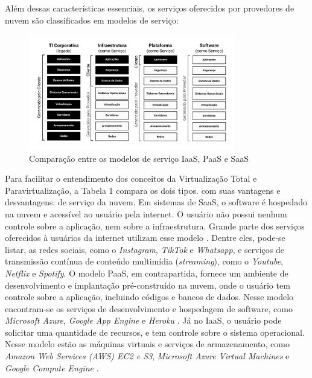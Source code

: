  



Além dessas características essenciais, os serviços oferecidos por provedores de nuvem são classificados em modelos de serviço:

 





\begin{figure}[htb]
\centering
\includegraphics[width=0.8\textwidth]{figuras/Figura 1 - Comparação entre os modelos de serviço.png}
\caption{Comparação entre os modelos de serviço IaaS, PaaS e SaaS}
\label{fig:modelos-servico}
\end{figure}

Para facilitar o entendimento dos conceitos da Virtualização Total e Paravirtualização, a Tabela 1 compara os dois tipos. com suas vantagens e desvantagens: de serviço
 da nuvem. Em sistemas de SaaS, o software é hospedado na nuvem e acessível ao usuário pela internet. O usuário não possui nenhum controle sobre a aplicação, nem sobre a infraestrutura. Grande parte dos serviços oferecidos à usuários da internet utilizam esse modelo \cite{rizvi2024}. Dentre eles, pode-se listar, as redes sociais, como o \textit{Instagram}, \textit{TikTok} e \textit{Whatsapp}, e serviços de transmissão contínua de conteúdo multimídia (\textit{streaming}), como o \textit{Youtube}, \textit{Netflix} e \textit{Spotify}. O modelo PaaS, em contrapartida, fornece um ambiente de desenvolvimento e implantação pré-construído na nuvem, onde o usuário tem controle sobre a aplicação, incluindo códigos e bancos de dados. Nesse modelo encontram-se os serviços de desenvolvimento e hospedagem de software, como \textit{Microsoft Azure}, \textit{Google App Engine} e \textit{Heroku} \cite{rizvi2024}. Já no IaaS, o usuário pode solicitar uma quantidade de recursos, e tem controle sobre o sistema operacional. Nesse modelo estão as máquinas virtuais e serviços de armazenamento, como  \textit{Amazon Web Services (AWS) EC2 e S3},  \textit{Microsoft Azure Virtual Machines} e  \textit{Google Compute Engine}  \cite{rizvi2024}.

